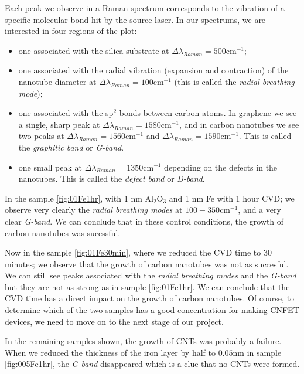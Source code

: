 \documentclass[a4paper,12pt,twoside]{article}
\begin{document}
Each peak we observe in a Raman spectrum corresponds to the vibration of a specific molecular bond hit by the source laser. In our spectrums, we are interested in four regions of the plot:
\begin{itemize}
    \item one associated with the silica substrate at $\Delta \lambda_{Raman} = 500 \mathrm{cm^{-1}}$;
    \item one associated with the radial vibration (expansion and contraction) of the nanotube diameter at $\Delta \lambda_{Raman} = 100 \mathrm{cm^{-1}}$ (this is called the \textit{radial breathing mode});
    \item one associated with the sp$^2$ bonds between carbon atoms. In graphene we see a single, sharp peak at $\Delta \lambda_{Raman} = 1580 \mathrm{cm^{-1}}$, and in carbon nanotubes we see two peaks at $\Delta \lambda_{Raman} = 1560 \mathrm{cm^{-1}}$ and $\Delta \lambda_{Raman} = 1590 \mathrm{cm^{-1}}$. This is called the \textit{graphitic band} or \textit{G-band}.
    \item one small peak at $\Delta \lambda_{Raman} = 1350 \mathrm{cm^{-1}}$ depending on the defects in the nanotubes. This is called the \textit{defect band} or \textit{D-band}.
\end{itemize}

In the sample \ref{fig:01Fe1hr}, with 1 nm Al$_2$O$_3$ and 1 nm Fe with 1 hour CVD; we observe very clearly the \textit{radial breathing modes} at $100-350 \mathrm{cm^{-1}}$, and a very clear \textit{G-band}. We can conclude that in these control conditions, the growth of carbon nanotubes was sucessful.

Now in the sample \ref{fig:01Fe30min}, where we reduced the CVD time to 30 minutes; we observe that the growth of carbon nanotubes was not as succesful. We can still see peaks associated with the \textit{radial breathing modes} and the \textit{G-band} but they are not as strong as in sample \ref{fig:01Fe1hr}. We can conclude that the CVD time has a direct impact on the growth of carbon nanotubes. Of course, to determine which of the two samples has a good concentration for making CNFET devices, we need to move on to the next stage of our project.

In the remaining samples shown, the growth of CNTs was probably a failure. When we reduced the thickness of the iron layer by half to $0.05 \mathrm{nm}$ in sample \ref{fig:005Fe1hr}, the \textit{G-band} disappeared which is a clue that no CNTs were formed.
\end{document}

